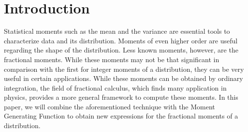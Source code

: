 \section{Introduction}\label{s:intro}
Statistical moments such as the mean and the variance are essential tools to characterize data and its distribution. Moments of even higher order are useful regarding the shape of the distribution. Less known moments, however, are the fractional moments. While these moments may not  be that significant in comparison with the first for integer moments of a distribution, they can be very useful in certain applications. While these moments can be obtained by ordinary integration, the field of fractional calculus, which finds many application in physics, provides a more general framework to compute these moments. In this paper, we will combine the aforementioned technique with the Moment Generating Function to obtain new expressions for the fractional moments of a distribution.